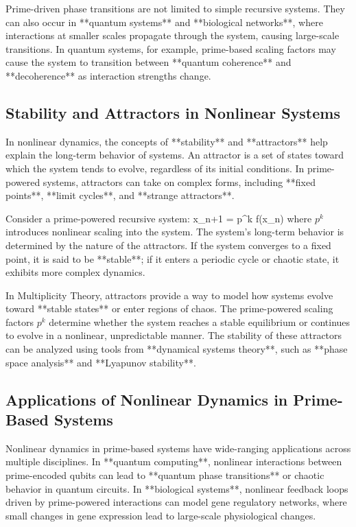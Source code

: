 \documentclass[12pt]{article}
\begin{document}
Prime-driven phase transitions are not limited to simple recursive systems. They can also occur in **quantum systems** and **biological networks**, where interactions at smaller scales propagate through the system, causing large-scale transitions. In quantum systems, for example, prime-based scaling factors may cause the system to transition between **quantum coherence** and **decoherence** as interaction strengths change.

\subsection{Stability and Attractors in Nonlinear Systems}

In nonlinear dynamics, the concepts of **stability** and **attractors** help explain the long-term behavior of systems. An attractor is a set of states toward which the system tends to evolve, regardless of its initial conditions. In prime-powered systems, attractors can take on complex forms, including **fixed points**, **limit cycles**, and **strange attractors**.

Consider a prime-powered recursive system:
\]
x_{n+1} = p^k f(x_n)
\]
where \( p^k \) introduces nonlinear scaling into the system. The system’s long-term behavior is determined by the nature of the attractors. If the system converges to a fixed point, it is said to be **stable**; if it enters a periodic cycle or chaotic state, it exhibits more complex dynamics.

In Multiplicity Theory, attractors provide a way to model how systems evolve toward **stable states** or enter regions of chaos. The prime-powered scaling factors \( p^k \) determine whether the system reaches a stable equilibrium or continues to evolve in a nonlinear, unpredictable manner. The stability of these attractors can be analyzed using tools from **dynamical systems theory**, such as **phase space analysis** and **Lyapunov stability**.

\subsection{Applications of Nonlinear Dynamics in Prime-Based Systems}

Nonlinear dynamics in prime-based systems have wide-ranging applications across multiple disciplines. In **quantum computing**, nonlinear interactions between prime-encoded qubits can lead to **quantum phase transitions** or chaotic behavior in quantum circuits. In **biological systems**, nonlinear feedback loops driven by prime-powered interactions can model gene regulatory networks, where small changes in gene expression lead to large-scale physiological changes.
\end{document}
